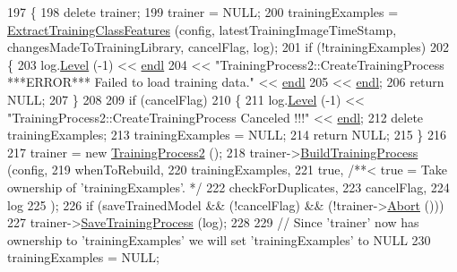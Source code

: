 \begin{DoxyCode}
197   \{
198     \textcolor{keyword}{delete} trainer;
199     trainer = NULL;
200     trainingExamples = \hyperlink{class_k_k_m_l_l_1_1_training_process2_aa1f7422d93e5db2d5f540d657b14720f}{ExtractTrainingClassFeatures} (config, 
      latestTrainingImageTimeStamp, changesMadeToTrainingLibrary, cancelFlag, log);
201     \textcolor{keywordflow}{if}  (!trainingExamples)
202     \{
203       log.\hyperlink{class_k_k_b_1_1_run_log_a32cf761d7f2e747465fd80533fdbb659}{Level} (-1) << \hyperlink{namespace_k_k_b_ad1f50f65af6adc8fa9e6f62d007818a8}{endl}
204         << \textcolor{stringliteral}{"TrainingProcess2::CreateTrainingProcess   ***ERROR***  Failed to load training data."} << 
      \hyperlink{namespace_k_k_b_ad1f50f65af6adc8fa9e6f62d007818a8}{endl}
205         << \hyperlink{namespace_k_k_b_ad1f50f65af6adc8fa9e6f62d007818a8}{endl};
206       \textcolor{keywordflow}{return} NULL;
207     \}
208 
209     \textcolor{keywordflow}{if}  (cancelFlag)
210     \{
211       log.\hyperlink{class_k_k_b_1_1_run_log_a32cf761d7f2e747465fd80533fdbb659}{Level} (-1) << \textcolor{stringliteral}{"TrainingProcess2::CreateTrainingProcess   Canceled !!!"} << 
      \hyperlink{namespace_k_k_b_ad1f50f65af6adc8fa9e6f62d007818a8}{endl};
212       \textcolor{keyword}{delete}  trainingExamples;
213       trainingExamples = NULL;
214       \textcolor{keywordflow}{return} NULL;
215     \}
216 
217     trainer = \textcolor{keyword}{new} \hyperlink{class_k_k_m_l_l_1_1_training_process2_a56455bc6c87316ccfd3afbe4c3323f5e}{TrainingProcess2} ();
218     trainer->\hyperlink{class_k_k_m_l_l_1_1_training_process2_a8b80079d09f7813e347343ebbefb14fb}{BuildTrainingProcess} (config,
219                                    whenToRebuild,
220                                    trainingExamples,
221                                    \textcolor{keyword}{true},                 \textcolor{comment}{/**<  true = Take ownership of 'trainingExamples'.
       */}
222                                    checkForDuplicates,
223                                    cancelFlag,
224                                    log
225                                   );
226     \textcolor{keywordflow}{if}  (saveTrainedModel  &&   (!cancelFlag)  &&  (!trainer->\hyperlink{class_k_k_m_l_l_1_1_training_process2_a11725f4aac3b45c7a070bc78aa406724}{Abort} ()))
227       trainer->\hyperlink{class_k_k_m_l_l_1_1_training_process2_a251864b9100b64113649b171b2634900}{SaveTrainingProcess} (log);
228 
229     \textcolor{comment}{// Since 'trainer' now has ownership to 'trainingExamples' we will set 'trainingExamples' to NULL}
230     trainingExamples = NULL;

\end{DoxyCode}
